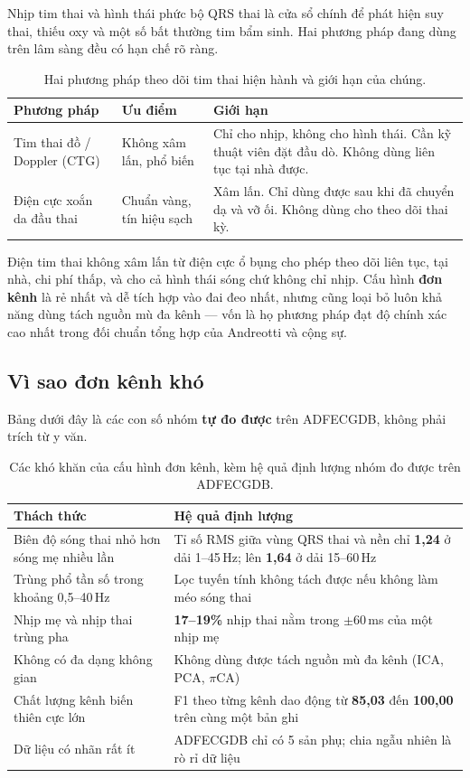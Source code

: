 Nhịp tim thai và hình thái phức bộ QRS thai là cửa sổ chính để phát hiện suy thai, thiếu oxy và một số
bất thường tim bẩm sinh. Hai phương pháp đang dùng trên lâm sàng đều có hạn chế rõ ràng.

\begin{table}[H]\centering\small
\caption{Hai phương pháp theo dõi tim thai hiện hành và giới hạn của chúng.}
\label{tab:lamsang}
\begin{tabular}{@{}L{4.0cm} L{5.0cm} L{5.4cm}@{}}
\toprule
\textbf{Phương pháp} & \textbf{Ưu điểm} & \textbf{Giới hạn} \\
\midrule
Tim thai đồ / Doppler (CTG) & Không xâm lấn, phổ biến & Chỉ cho nhịp, không cho hình thái. Cần kỹ thuật
viên đặt đầu dò. Không dùng liên tục tại nhà được. \\
Điện cực xoắn da đầu thai & Chuẩn vàng, tín hiệu sạch & Xâm lấn. Chỉ dùng được sau khi đã chuyển dạ
và vỡ ối. Không dùng cho theo dõi thai kỳ. \\
\bottomrule
\end{tabular}
\end{table}

Điện tim thai không xâm lấn từ điện cực ổ bụng cho phép theo dõi liên tục, tại nhà, chi phí thấp, và
cho cả hình thái sóng chứ không chỉ nhịp. Cấu hình \textbf{đơn kênh} là rẻ nhất và dễ tích hợp vào đai
đeo nhất, nhưng cũng loại bỏ luôn khả năng dùng tách nguồn mù đa kênh --- vốn là họ phương pháp đạt độ
chính xác cao nhất trong đối chuẩn tổng hợp của Andreotti và cộng sự.

\subsection{Vì sao đơn kênh khó}

Bảng dưới đây là các con số nhóm \textbf{tự đo được} trên ADFECGDB, không phải trích từ y văn.

\begin{table}[H]\centering\small
\caption{Các khó khăn của cấu hình đơn kênh, kèm hệ quả định lượng nhóm đo được trên ADFECGDB.}
\label{tab:khokhan}
\begin{tabular}{@{}L{6.2cm} L{8.2cm}@{}}
\toprule
\textbf{Thách thức} & \textbf{Hệ quả định lượng} \\
\midrule
Biên độ sóng thai nhỏ hơn sóng mẹ nhiều lần & Tỉ số RMS giữa vùng QRS thai và nền chỉ \textbf{1,24}
ở dải 1--45\,Hz; lên \textbf{1,64} ở dải 15--60\,Hz \\
Trùng phổ tần số trong khoảng 0,5--40\,Hz & Lọc tuyến tính không tách được nếu không làm méo sóng thai \\
Nhịp mẹ và nhịp thai trùng pha & \textbf{17--19\%} nhịp thai nằm trong $\pm$60\,ms của một nhịp mẹ \\
Không có đa dạng không gian & Không dùng được tách nguồn mù đa kênh (ICA, PCA, $\pi$CA) \\
Chất lượng kênh biến thiên cực lớn & F1 theo từng kênh dao động từ \textbf{85,03} đến \textbf{100,00}
trên cùng một bản ghi \\
Dữ liệu có nhãn rất ít & ADFECGDB chỉ có 5 sản phụ; chia ngẫu nhiên là rò rỉ dữ liệu \\
\bottomrule
\end{tabular}
\end{table}


